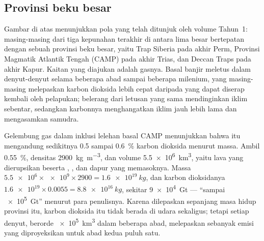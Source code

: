 
\subsection*{Provinsi beku besar}

Gambar di atas menunjukkan pola yang telah ditunjuk oleh volume Tahun~1: masing-masing dari tiga kepunahan terakhir di antara
lima besar bertepatan dengan sebuah provinsi beku besar, yaitu Trap Siberia pada akhir Perm,
Provinsi Magmatik Atlantik Tengah (CAMP) pada akhir Trias, dan Deccan Traps pada
akhir Kapur. Kaitan yang diajukan adalah gasnya. Basal banjir meletus dalam denyut-denyut selama beberapa
abad sampai beberapa milenium, yang masing-masing melepaskan karbon dioksida lebih cepat daripada yang dapat diserap kembali oleh pelapukan;
belerang dari letusan yang sama mendinginkan iklim sebentar, sedangkan karbonnya menghangatkan iklim jauh
lebih lama dan mengasamkan samudra.

\begin{example}\label{ex:b2:phanerozoic-earth:camp}
Gelembung gas dalam inklusi lelehan basal CAMP menunjukkan bahwa  itu mengandung sedikitnya 0.5 sampai
\qty{0.6}{\percent} karbon dioksida menurut massa. Ambil \qty{0.55}{\percent}, densitas
\qty{2900}{kg.m^{-3}}, dan volume \qty{5.5e6}{km^3}, yaitu lava yang dierupsikan beserta , ,
dan dapur  yang memasoknya. Massa  $\num{5.5e6} \times \num{e9} \times 2900 =
\qty{1.6e19}{kg}$, dan karbon dioksidanya $\num{1.6e19} \times 0.0055 = \qty{8.8e16}{kg}$, sekitar
\qty{9e4}{Gt} --- ``sampai \qty{e5}{Gt}'' menurut para penulisnya. Karena dilepaskan sepanjang masa hidup provinsi itu, karbon dioksida itu
tidak berada di udara sekaligus; tetapi setiap denyut, berorde \qty{e5}{km^3} dalam beberapa
abad, melepaskan sebanyak emisi yang diproyeksikan untuk abad kedua puluh satu.
\end{example}

